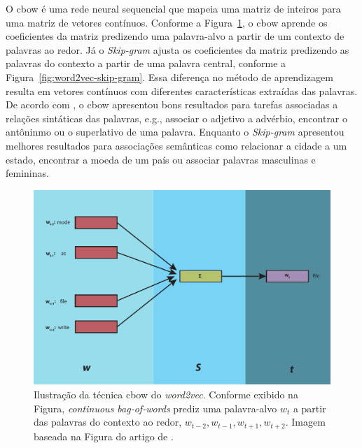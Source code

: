  O \acrshort{cbow} é uma rede neural sequencial que mapeia uma matriz de inteiros para uma matriz de vetores contínuos. Conforme a Figura~\ref{fig:word2vec-cbow}, o \acrshort{cbow} aprende os coeficientes da matriz predizendo uma palavra-alvo a partir de um contexto de palavras ao redor. Já o \textit{Skip-gram} ajusta os coeficientes da matriz predizendo as palavras do contexto a partir de uma palavra central, conforme a Figura~\ref{fig:word2vec-skip-gram}. Essa diferença no método de aprendizagem resulta em vetores contínuos com diferentes características extraídas das palavras. De acordo com \cite{mikolov2013distributed}, o \acrshort{cbow} apresentou bons resultados para tarefas associadas a relações sintáticas das palavras, e.g., associar o adjetivo a advérbio, encontrar o antôninmo ou o superlativo de uma palavra. Enquanto o \textit{Skip-gram} apresentou melhores resultados para associações semânticas como relacionar a cidade a um estado, encontrar a moeda de um país ou associar palavras masculinas e femininas.

\begin{figure}[H]
\centering
\includegraphics[width=.8\textwidth]{figuras/cap-trabalhos-relacionados/word2vec-cbow.pdf}
\caption{Ilustração da técnica \acrfull{cbow} do \textit{word2vec}. Conforme exibido na Figura, \textit{continuous bag-of-words} prediz uma palavra-alvo $w_{t}$ a partir das palavras do contexto ao redor, $w_{t - 2}, w_{t - 1}, w_{t + 1}, w_{t + 2}$. Imagem baseada na Figura do artigo de \cite{mikolov2013distributed}.} 
\label{fig:word2vec-cbow}
\end{figure}

